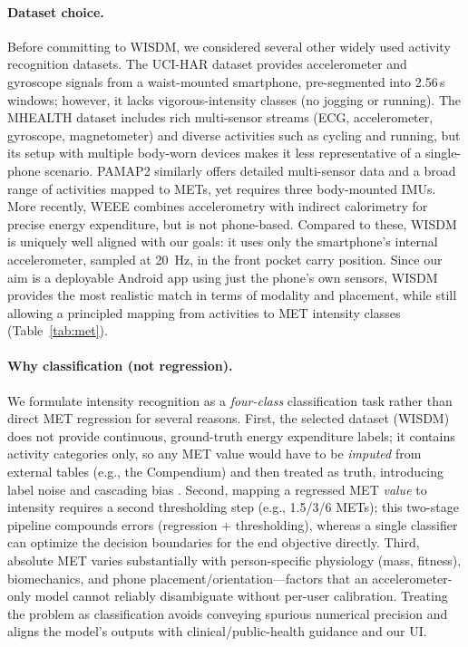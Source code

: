\documentclass[10pt,twocolumn]{article}
\begin{document}
\paragraph{Dataset choice.} 
Before committing to WISDM, we considered several other widely used activity recognition datasets. The UCI-HAR dataset \cite{UCIHAR} provides accelerometer and gyroscope signals from a waist-mounted smartphone, pre-segmented into 2.56\,s windows; however, it lacks vigorous-intensity classes (no jogging or running). The MHEALTH dataset \cite{MHEALTH} includes rich multi-sensor streams (ECG, accelerometer, gyroscope, magnetometer) and diverse activities such as cycling and running, but its setup with multiple body-worn devices makes it less representative of a single-phone scenario. PAMAP2 \cite{PAMAP2} similarly offers detailed multi-sensor data and a broad range of activities mapped to METs, yet requires three body-mounted IMUs. More recently, WEEE \cite{WEEE} combines accelerometry with indirect calorimetry for precise energy expenditure, but is not phone-based. Compared to these, WISDM \cite{Kwapisz2010,wisdm_site} is uniquely well aligned with our goals: it uses only the smartphone’s internal accelerometer, sampled at 20\, Hz, in the front pocket carry position. Since our aim is a deployable Android app using just the phone’s own sensors, WISDM provides the most realistic match in terms of modality and placement, while still allowing a principled mapping from activities to MET intensity classes (Table~\ref{tab:met}).

\paragraph{Why classification (not regression).}
We formulate intensity recognition as a \emph{four-class} classification task rather than direct MET regression for several reasons. First, the selected dataset (WISDM) does not provide continuous, ground-truth energy expenditure labels; it contains activity categories only, so any MET value would have to be \emph{imputed} from external tables (e.g., the Compendium) and then treated as truth, introducing label noise and cascading bias \cite{Compendium2024,Compendium2011,wisdm_site}. Second, mapping a regressed MET \emph{value} to intensity requires a second thresholding step (e.g., 1.5/3/6 METs); this two-stage pipeline compounds errors (regression + thresholding), whereas a single classifier can optimize the decision boundaries for the end objective directly. Third, absolute MET varies substantially with person-specific physiology (mass, fitness), biomechanics, and phone placement/orientation—factors that an accelerometer-only model cannot reliably disambiguate without per-user calibration. Treating the problem as classification avoids conveying spurious numerical precision and aligns the model’s outputs with clinical/public-health guidance and our UI.
\end{document}
